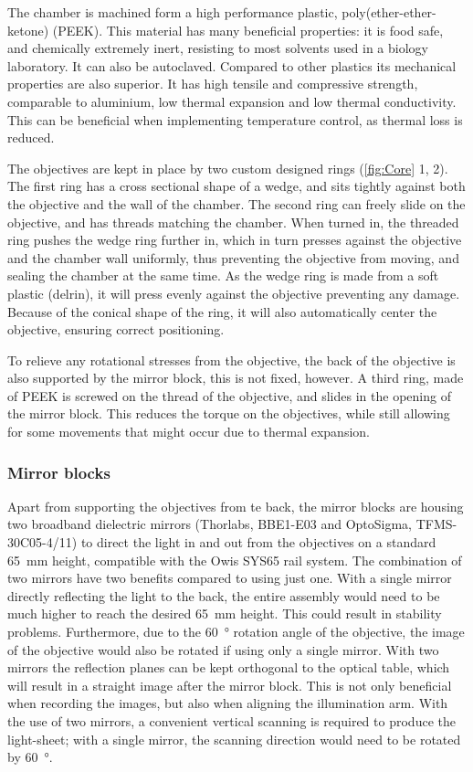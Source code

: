     The chamber is machined form a high performance plastic, poly(ether-ether-ketone) (PEEK). This material has many beneficial properties: it is food safe, and chemically extremely inert, resisting to most solvents used in a biology laboratory. It can also be autoclaved. Compared to other plastics its mechanical properties are also superior. It has high tensile and compressive strength, comparable to aluminium, low thermal expansion and low thermal conductivity. This can be beneficial when implementing temperature control, as thermal loss is reduced.

    The objectives are kept in place by two custom designed rings (\autoref{fig:Core} 1, 2). The first ring has a cross sectional shape of a wedge, and sits tightly against both the objective and the wall of the chamber. The second ring can freely slide on the objective, and has threads matching the chamber. When turned in, the threaded ring pushes the wedge ring further in, which in turn presses against the objective and the chamber wall uniformly, thus preventing the objective from moving, and sealing the chamber at the same time. As the wedge ring is made from a soft plastic (delrin), it will press evenly against the objective preventing any damage. Because of the conical shape of the ring, it will also automatically center the objective, ensuring correct positioning.

    To relieve any rotational stresses from the objective, the back of the objective is also supported  by the mirror block, this is not fixed, however. A third ring, made of PEEK is screwed on the thread of the objective, and slides in the opening of the mirror block. This reduces the torque on the objectives, while still allowing for some movements that might occur due to thermal expansion.

    \subsubsection{Mirror blocks}
    \label{sec:mirrors}
    Apart from supporting the objectives from te back, the mirror blocks are housing two broadband dielectric mirrors (Thorlabs, BBE1-E03 and OptoSigma, TFMS-30C05-4/11) to direct the light in and out from the objectives on a standard \SI{65}{mm} height, compatible with the Owis SYS65 rail system. The combination of two mirrors have two benefits compared to using just one. With a single mirror directly reflecting the light to the back, the entire assembly would need to be much higher to reach the desired \SI{65}{mm} height. This could result in stability problems. Furthermore, due to the \SI{60}{\degree} rotation angle of the objective, the image of the objective would also be rotated if using only a single mirror. With two mirrors the reflection planes can be kept orthogonal to the optical table, which will result in a straight image after the mirror block. This is not only beneficial when recording the images, but also when aligning the illumination arm. With the use of two mirrors, a convenient vertical scanning is required to produce the light-sheet; with a single mirror, the scanning direction would need to be rotated by \SI{60}{\degree}.


